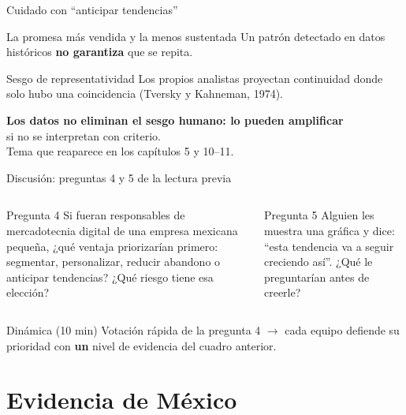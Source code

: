\documentclass[aspectratio=169,xcolor=dvipsnames]{beamer}
\begin{document}
\begin{frame}{Cuidado con \enquote{anticipar tendencias}}
\begin{alertblock}{La promesa más vendida y la menos sustentada}
  Un patrón detectado en datos históricos \textbf{no garantiza} que se repita.
\end{alertblock}
\begin{block}{Sesgo de representatividad}
  Los propios analistas proyectan continuidad donde solo hubo una coincidencia (Tversky y Kahneman, 1974).
\end{block}
\vspace{4pt}
\begin{center}
  \textbf{Los datos no eliminan el sesgo humano: lo pueden amplificar}\\
  si no se interpretan con criterio.\\[4pt]
  {\small\color{IPNgris}Tema que reaparece en los capítulos 5 y 10--11.}
\end{center}
\end{frame}

\begin{frame}{Discusión: preguntas 4 y 5 de la lectura previa}
\begin{columns}[T]
  \begin{exampleblock}{Pregunta 4}
    \small Si fueran responsables de mercadotecnia digital de una empresa mexicana pequeña, ¿qué ventaja priorizarían primero: segmentar, personalizar, reducir abandono o anticipar tendencias? ¿Qué riesgo tiene esa elección?
  \end{exampleblock}
  \begin{exampleblock}{Pregunta 5}
    \small Alguien les muestra una gráfica y dice: \enquote{esta tendencia va a seguir creciendo así}. ¿Qué le preguntarían antes de creerle?
  \end{exampleblock}
\end{columns}
\vspace{8pt}
\begin{block}{Dinámica (10 min)}
  \small Votación rápida de la pregunta 4 $\rightarrow$ cada equipo defiende su prioridad con \textbf{un} nivel de evidencia del cuadro anterior.
\end{block}
\end{frame}

\section[Evidencia]{Evidencia de México}
\end{document}
